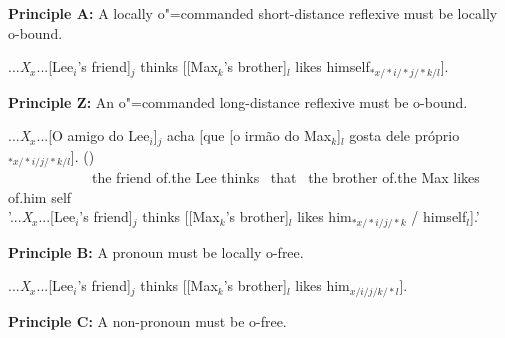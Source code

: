 \documentclass[output=paper
,modfonts
,nonflat]{langsci/langscibook}
\begin{document}
%
	

\begin{exe}
\ex
\label{PrincipleA}
{\textbf{Principle A:}} A locally o"=commanded short-distance
reflexive must be \mbox{locally} o-bound.

\sn
{...{\em X}$_{x}$...[Lee$_{i}$'s friend]$_{j}$ thinks
[[Max$_{k}$'s brother]$_{l}$ likes %
himself$_{*x/*i/*j/*k/l}$].}
\end{exe}


\begin{exe}
\ex
\label{PrincipleZ}
{\textbf{Principle Z:}} An o"=commanded long-distance reflexive must be
o-bound.

\sn
\gll ...{\em X}$_{x}$...[O amigo do Lee$_{i}$]$_{j}$ acha [que [o
irm\~{a}o do Max$_{k}$]$_{l}$ gosta dele pr\'{o}prio$_{*x/*i/j/*k/l}$]. ()\\ \mbox{ }\mbox{ }\mbox{ }\mbox{ }\mbox{ }\mbox{ }\mbox{ }\mbox{ }\mbox{ }\mbox{ }\mbox{ }\mbox{ }the friend of.the Lee thinks \mbox{ }that \mbox{ }the brother of.the Max likes of.him self\\
\trans '...{\em X}$_{x}$...[Lee$_{i}$'s friend]$_{j}$ thinks [[Max$_{k}$'s brother]$_{l}$
likes him$_{*x/*i/j/*k}$ / \linebreak
himself$_{l}$].'
\end{exe}



\begin{exe}
\ex
\label{PrincipleB}
{\textbf{Principle B:}} A pronoun must be locally o-free.


\sn
{...{\em X}$_{x}$...[Lee$_{i}$'s friend]$_{j}$ thinks [[Max$_{k}$'s brother]$_{l}$
likes %
 him$_{x/i/j/k/*l}$].}
\end{exe}



\begin{exe}
\ex
\label{PrincipleC}
{\textbf{Principle C:}} A non-pronoun must be o-free.

\end{exe}
\vspace{4 mm}
\end{document}
